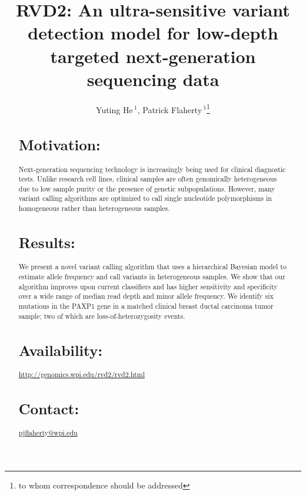\documentclass{bioinfo}
\begin{document}

\title[RVD2]{RVD2: An ultra-sensitive variant detection model for low-depth targeted next-generation sequencing data}
\author[He \textit{et~al}]{Yuting He\,$^{1}$, Patrick Flaherty\,$^{1}$\footnote{to whom correspondence should be addressed}}
\address{$^{1}$Department of Biomedical Engineering, Worcester Polytechnic Institute, Worcester, MA, USA}



\maketitle

\begin{abstract}

\section{Motivation:}
Next-generation sequencing technology is increasingly being used for clinical diagnostic tests. Unlike research cell lines, clinical samples are often genomically heterogeneous due to low sample purity or the presence of genetic subpopulations. However, many variant calling algorithms are optimized to call single nucleotide polymorphisms in homogeneous rather than heterogeneous samples.

\section{Results:}
We present a novel variant calling algorithm that uses a hierarchical Bayesian model to estimate allele frequency and call variants in heterogeneous samples. We show that our algorithm improves upon current classifiers and has higher sensitivity and specificity over a wide range of median read depth and minor allele frequency. We identify six mutations in the PAXP1 gene in a matched clinical breast ductal carcinoma tumor sample; two of which are loss-of-heterozygosity events.

\section{Availability:}
\href{http://genomics.wpi.edu/rvd2/rvd2.html}{http://genomics.wpi.edu/rvd2/rvd2.html}

\section{Contact:} \href{pjflaherty@wpi.edu}{pjflaherty@wpi.edu}
\end{abstract}
\end{document}
